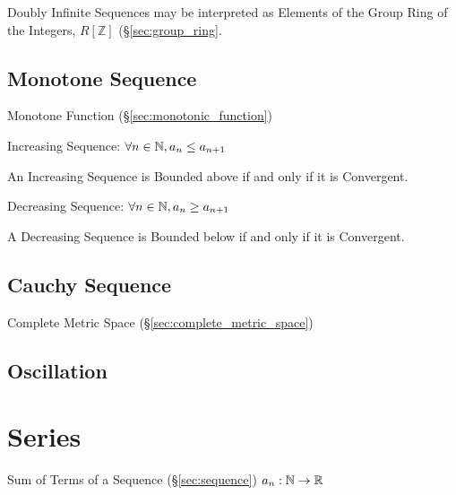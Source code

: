 Doubly Infinite Sequences may be interpreted as Elements of the Group
Ring of the Integers, $R[\mathbb{Z}]$ (\S\ref{sec:group_ring}.



\subsection{Monotone Sequence}\label{sec:monotone_sequence}

Monotone Function (\S\ref{sec:monotonic_function})

Increasing Sequence: $\forall n \in \mathbb{N}, a_n \leq a_{n+1}$

An Increasing Sequence is Bounded above if and only if it is
Convergent.

Decreasing Sequence: $\forall n \in \mathbb{N}, a_n \geq a_{n+1}$

A Decreasing Sequence is Bounded below if and only if it is
Convergent.



\subsection{Cauchy Sequence}\label{sec:cauchy_sequence}

Complete Metric Space (\S\ref{sec:complete_metric_space})



\subsection{Oscillation}\label{sec:oscillation}



\section{Series}\label{sec:series}

Sum of Terms of a Sequence (\S\ref{sec:sequence}) $a_n : \mathbb{N}
\rightarrow \mathbb{R}$



